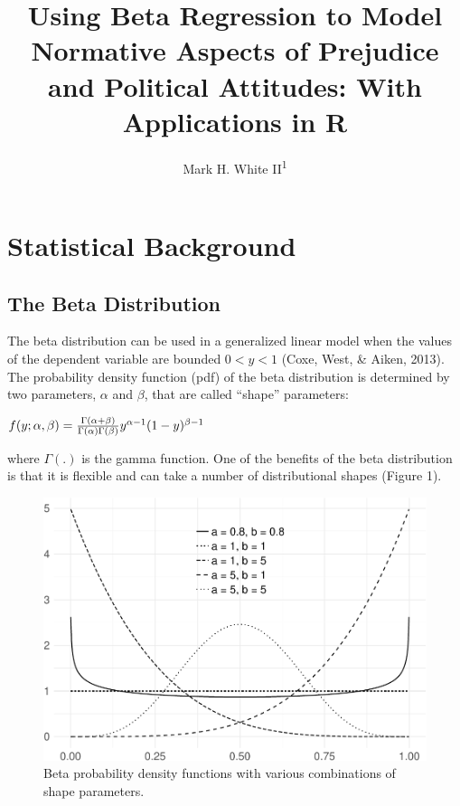 \documentclass[english,man]{apa6}
\title{Using Beta Regression to Model Normative Aspects of Prejudice and
Political Attitudes: With Applications in R}
\author{Mark H. White II\textsuperscript{1}}
\affiliation{
    \vspace{0.5cm}
          \textsuperscript{1} University of Kansas  }
\theoremstyle{definition}
\theoremstyle{definition}
\theoremstyle{remark}
\begin{document}
\maketitle

\setcounter{secnumdepth}{0}



\section{Statistical Background}\label{statistical-background}

\subsection{The Beta Distribution}\label{the-beta-distribution}

The beta distribution can be used in a generalized linear model when the
values of the dependent variable are bounded \(0 < y < 1\) (Coxe, West,
\& Aiken, 2013). The probability density function (pdf) of the beta
distribution is determined by two parameters, \(\alpha\) and \(\beta\),
that are called \enquote{shape} parameters:

\begin{center}
$f(y;\alpha,\beta)={\Gamma(\alpha+\beta)\over\Gamma(\alpha)\Gamma(\beta)}y^{\alpha-1}(1-y)^{\beta-1}$
\end{center}

where \(\Gamma(.)\) is the gamma function. One of the benefits of the
beta distribution is that it is flexible and can take a number of
distributional shapes (Figure 1).

\begin{figure}
\centering
\includegraphics{beta_hurdle_files/figure-latex/unnamed-chunk-2-1.pdf}
\caption{\label{fig:unnamed-chunk-2}Beta probability density functions with
various combinations of shape parameters.}
\end{figure}
\end{document}

